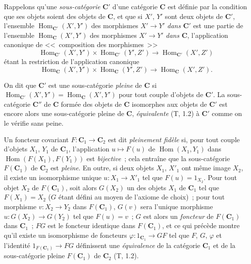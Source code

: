 \begin{env}[8.1.5]
\label{0.8.1.5-fr}
Rappelons qu'une \emph{sous-catégorie} $\boldsymbol{C}'$ d'une catégorie $\boldsymbol{C}$ est définie
par la condition que ses objets soient des objets de $\boldsymbol{C}$, et que si $X'$,
$Y'$ sont deux objets de $\boldsymbol{C}'$, l'ensemble
$\operatorname{Hom}_{\mathbf{C}'}(X',Y')$ des morphismes $X'\to Y'$ \emph{dans
$\boldsymbol{C}'$} est une partie de l'ensemble $\operatorname{Hom}_{\mathbf{C}}(X',Y')$ des
morphismes $X'\to Y'$ \emph{dans $\boldsymbol{C}$}, l'application canonique de
<<~composition des morphismes~>>
\[
  \operatorname{Hom}_{\mathbf{C}'}(X',Y')\times\operatorname{Hom}_{\mathbf{C}'}(Y',Z')
  \to\operatorname{Hom}_{\mathbf{C}'}(X',Z')
\]
étant la restriction de l'application canonique
\[
  \operatorname{Hom}_{\mathbf{C}}(X',Y')\times\operatorname{Hom}_{\mathbf{C}}(Y',Z')
  \to\operatorname{Hom}_{\mathbf{C}}(X',Z').
\]

On dit que $\boldsymbol{C}'$ est une sous-catégorie \emph{pleine} de $\boldsymbol{C}$ si
$\operatorname{Hom}_{\mathbf{C}'}(X',Y')=\operatorname{Hom}_{\mathbf{C}}(X',Y')$ pour tout
couple d'objets de $\boldsymbol{C}'$. La sous-catégorie $\boldsymbol{C}''$ de $\boldsymbol{C}$ formée des objets de
$\boldsymbol{C}$ isomorphes aux objets de $\boldsymbol{C}'$ est encore alors une sous-catégorie pleine
de $\boldsymbol{C}$, \emph{équivalente} (T, 1.2) à $\boldsymbol{C}'$ comme on le vérifie sans peine.

Un foncteur covariant $F:\boldsymbol{C}_1\to\boldsymbol{C}_2$ est dit \emph{pleinement fidèle} si,
pour tout couple d'objets $X_1$, $Y_1$ de $\boldsymbol{C}_1$, l'application
$u\mapsto F(u)$ de $\operatorname{Hom}(X_1,Y_1)$ dans
$\operatorname{Hom}(F(X_1),F(Y_1))$ est \emph{bijective}~; cela entraîne que
la sous-catégorie $F(\boldsymbol{C}_1)$ de $\boldsymbol{C}_2$ est \emph{pleine}. En outre, si deux
objets $X_1$, $X'_1$ ont même image $X_2$, il existe un isomorphisme unique
$u:X_1\to X'_1$ tel que $F(u)=1_{X_2}$. Pour tout objet $X_2$ de $F(\boldsymbol{C}_1)$,
soit alors $G(X_2)$ un des objets $X_1$ de $\boldsymbol{C}_1$ tel que $F(X_1)=X_2$
($G$ étant défini au moyen de l'axiome de choix)~; pour tout morphisme
$v:X_2\to Y_2$ dans $F(\boldsymbol{C}_1)$, $G(v)$ sera l'unique morphisme
$u:G(X_2)\to G(Y_2)$ tel que $F(u)=v$~; $G$ est alors un \emph{foncteur} de
$F(\boldsymbol{C}_1)$ dans $\boldsymbol{C}_1$~; $FG$ est le foncteur identique dans $F(\boldsymbol{C}_1)$, et ce
qui précède montre qu'il existe un isomorphisme de foncteurs
$\varphi:\boldsymbol{\mathit{1}}_{\mathbf{C}_1}\to GF$ tel que $F$, $G$, $\varphi$ et l'identité
$\boldsymbol{\mathit{1}}_{F(\mathbf{C}_1)}\to FG$ définissent une \emph{équivalence} de la catégorie $\boldsymbol{C}_1$
et de la sous-catégorie pleine $F(\boldsymbol{C}_1)$ de $\boldsymbol{C}_2$ (T, 1.2).
\end{env}

